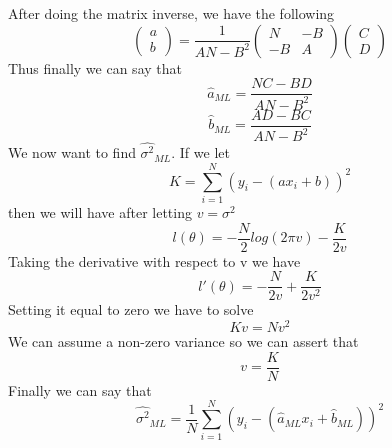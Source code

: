 \documentclass[11pt,psfig]{article}
\begin{document}
After doing the matrix inverse, we have the following 
\[ 
\left( \begin{array}{ccc}
a \\
b \end{array} \right) =
\frac{1}{AN - B^2}
\left( \begin{array}{ccc}
N & -B \\
-B & A \end{array} \right)
\left( \begin{array}{ccc}
C \\
D \end{array} \right)
\]
Thus finally we can say that
\[
\hat{a}_{ML} = \frac{NC-BD}{AN-B^2}
\]
\[
\hat{b}_{ML} = \frac{AD-BC}{AN-B^2}
\]
We now want to find $\hat{\sigma^2}_{ML}$. If we let
\[
K = \sum_{i=1}^N{(y_i - (ax_i + b))^2}
\]
then we will have after letting $v = \sigma^2$
\[
l(\theta) = -\frac{N}{2} log(2\pi v) - \frac{K}{2v}
\]
Taking the derivative with respect to v we have
\[
l'(\theta) = -\frac{N}{2v} + \frac{K}{2v^2}
\]
Setting it equal to zero we have to solve
\[
Kv = N v^2
\]
We can assume a non-zero variance so we can assert that
\[
v = \frac{K}{N}
\]
Finally we can say that
\[
\hat{\sigma^2}_{ML} = \frac{1}{N} \sum_{i=1}^N{(y_i - (\hat{a}_{ML}x_i + \hat{b}_{ML}))^2}
\]
\end{document}

